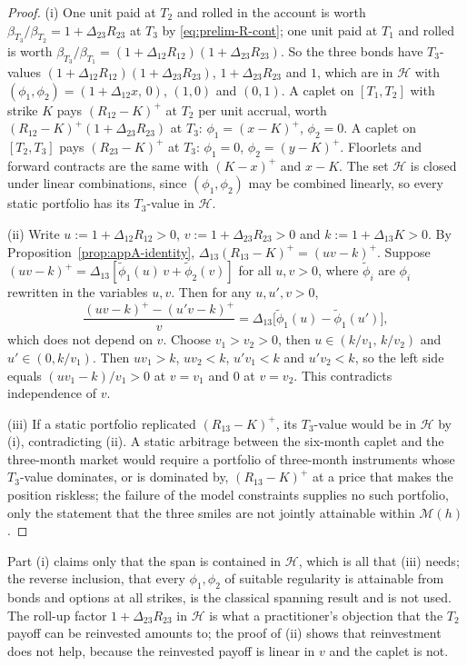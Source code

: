 \documentclass[../../main.tex]{subfiles}
\begin{document}
\begin{proof}
(i) One unit paid at $T_2$ and rolled in the account is worth $\beta_{T_3}/\beta_{T_2}=1+\Delta_{23}R_{23}$ at $T_3$ by \eqref{eq:prelim-R-cont}; one unit paid at $T_1$ and rolled is worth $\beta_{T_3}/\beta_{T_1}=(1+\Delta_{12}R_{12})(1+\Delta_{23}R_{23})$. So the three bonds have $T_3$-values $(1+\Delta_{12}R_{12})(1+\Delta_{23}R_{23})$, $1+\Delta_{23}R_{23}$ and $1$, which are in $\mathcal H$ with $(\phi_1,\phi_2)=(1+\Delta_{12}x,\,0)$, $(1,0)$ and $(0,1)$. A caplet on $[T_1,T_2]$ with strike $K$ pays $(R_{12}-K)^+$ at $T_2$ per unit accrual, worth $(R_{12}-K)^+(1+\Delta_{23}R_{23})$ at $T_3$: $\phi_1=(x-K)^+$, $\phi_2=0$. A caplet on $[T_2,T_3]$ pays $(R_{23}-K)^+$ at $T_3$: $\phi_1=0$, $\phi_2=(y-K)^+$. Floorlets and forward contracts are the same with $(K-x)^+$ and $x-K$. The set $\mathcal H$ is closed under linear combinations, since $(\phi_1,\phi_2)$ may be combined linearly, so every static portfolio has its $T_3$-value in $\mathcal H$.

(ii) Write $u:=1+\Delta_{12}R_{12}>0$, $v:=1+\Delta_{23}R_{23}>0$ and $k:=1+\Delta_{13}K>0$. By Proposition~\ref{prop:appA-identity}, $\Delta_{13}(R_{13}-K)^+=(uv-k)^+$. Suppose $(uv-k)^+=\Delta_{13}[\tilde\phi_1(u)\,v+\tilde\phi_2(v)]$ for all $u,v>0$, where $\tilde\phi_i$ are $\phi_i$ rewritten in the variables $u,v$. Then for any $u,u',v>0$,
\[
\frac{(uv-k)^+-(u'v-k)^+}{v}=\Delta_{13}\big[\tilde\phi_1(u)-\tilde\phi_1(u')\big],
\]
which does not depend on $v$. Choose $v_1>v_2>0$, then $u\in(k/v_1,\,k/v_2)$ and $u'\in(0,k/v_1)$. Then $uv_1>k$, $uv_2<k$, $u'v_1<k$ and $u'v_2<k$, so the left side equals $(uv_1-k)/v_1>0$ at $v=v_1$ and $0$ at $v=v_2$. This contradicts independence of $v$.

(iii) If a static portfolio replicated $(R_{13}-K)^+$, its $T_3$-value would be in $\mathcal H$ by (i), contradicting (ii). A static arbitrage between the six-month caplet and the three-month market would require a portfolio of three-month instruments whose $T_3$-value dominates, or is dominated by, $(R_{13}-K)^+$ at a price that makes the position riskless; the failure of the model constraints supplies no such portfolio, only the statement that the three smiles are not jointly attainable within $\mathcal M(h)$.
\end{proof}

Part (i) claims only that the span is contained in $\mathcal H$, which is all that (iii) needs; the reverse inclusion, that every $\phi_1,\phi_2$ of suitable regularity is attainable from bonds and options at all strikes, is the classical spanning result and is not used. The roll-up factor $1+\Delta_{23}R_{23}$ in $\mathcal H$ is what a practitioner's objection that the $T_2$ payoff can be reinvested amounts to; the proof of (ii) shows that reinvestment does not help, because the reinvested payoff is linear in $v$ and the caplet is not.
\end{document}

